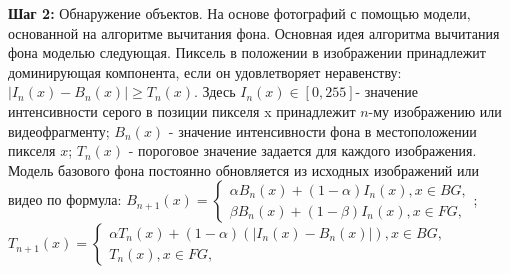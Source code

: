 \textbf{Шаг 2:} Обнаружение объектов. На основе фотографий с помощью модели, основанной на алгоритме вычитания фона. Основная идея алгоритма вычитания фона моделью следующая. Пиксель в положении в изображении принадлежит доминирующая компонента, если он удовлетворяет неравенству: $\left|I_n\left(x\right)-B_n\left(x\right)\right| \geq T_n\left(x\right)$. Здесь $ I_n\left(x\right) \in \left[0,255\right]$- значение интенсивности серого в позиции пикселя x принадлежит $n$-му изображению или видеофрагменту; $B_n \left(x\right)$  - значение интенсивности фона в местоположении пикселя $x$; $T_n \left(x\right)$  - пороговое значение задается для каждого изображения. Модель базового фона постоянно обновляется из исходных изображений или видео по формула: $B_{n+1}\left(x\right)= \left\{\begin{array}{l} \alpha B_n\left(x\right)+\left(1-\alpha\right)I_n\left(x\right),x\in BG,\\
\beta B_n\left(x\right)+\left(1-\beta\right)I_n\left(x\right),x\in FG,
\end{array}\right.$; $T_{n+1}\left(x\right)= \left\{\begin{array}{l} \alpha T_n \left(x\right)+\left(1-\alpha\right) \left(\left|I_n\left(x\right)-B_n\left(x\right)\right|\right), x \in BG,\\
T_n\left(x\right), x\in FG,
\end{array}\right.$

